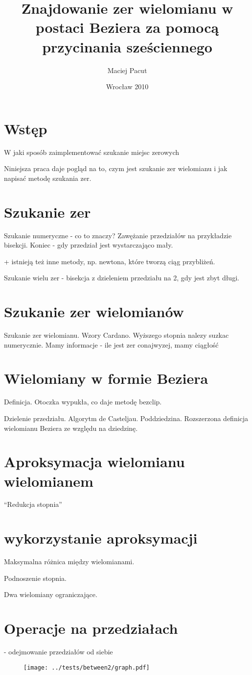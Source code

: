 \documentclass[11pt,a4paper,oneside]{report}
\title{Znajdowanie zer wielomianu w postaci Beziera za pomocą przycinania sześciennego}
\author{Maciej Pacut}
\date{Wrocław 2010}
\begin{document}
\maketitle
\newpage

\section{Wstęp}

W jaki sposób zaimplementować szukanie miejsc zerowych

Niniejsza praca daje pogląd na to, czym jest szukanie zer wielomianu i jak napisać metodę szukania zer.

\section{Szukanie zer}


Szukanie numeryczne - co to znaczy? Zawężanie przedziałów na przykładzie bisekcji. Koniec - gdy przedział jest wystarczająco mały.

+ istnieją też inne metody, np. newtona, które tworzą ciąg przybliżeń.

Szukanie wielu zer - bisekcja z dzieleniem przedziału na 2, gdy jest zbyt długi.

\section{Szukanie zer wielomianów}

Szukanie zer wielomianu. Wzory Cardano. Wyższego stopnia nalezy suzkac numerycznie. Mamy informacje - ile jest zer conajwyzej, mamy ciągłość

\section{Wielomiany w formie Beziera}

Definicja. Otoczka wypukła, co daje metodę bezclip.

Dzielenie przedziału. Algorytm de Casteljau. Poddziedzina. Rozszerzona definicja wielomianu Beziera ze względu na dziedzinę.

\section{Aproksymacja wielomianu wielomianem}

``Redukcja stopnia''

\section{wykorzystanie aproksymacji}

Maksymalna różnica między wielomianami.

Podnoszenie stopnia.

Dwa wielomiany ograniczające.

\section{Operacje na przedziałach}

- odejmowanie przedziałów od siebie

\begin{center}
\begin{figure}
\texttt{[image: ../tests/between2/graph.pdf]}
\end{figure}
\end{center}
\end{document}
